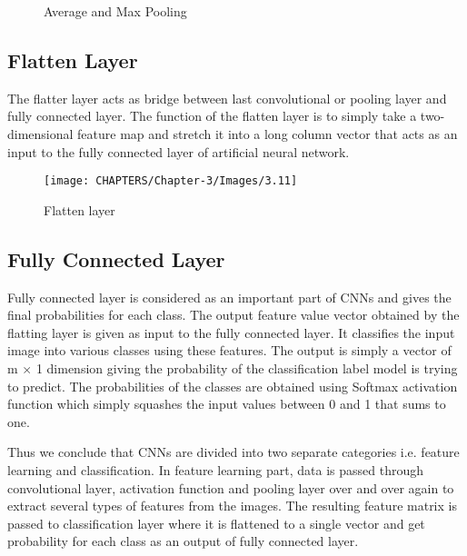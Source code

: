 \begin{figure}%
    \centering
    \qquad
    \caption{Average and Max Pooling}%
    \label{fig:3.10}%
\end{figure}

\subsection{Flatten Layer}

The flatter layer acts as bridge between last convolutional or pooling layer 
and fully connected layer. The function of the flatten layer is to simply take
a two-dimensional feature map and stretch it into a long column vector that acts as 
an input to the fully connected layer of artificial neural network.


\begin{figure}[H]
	\centering
		\texttt{[image: CHAPTERS/Chapter-3/Images/3.11]}
	\caption{Flatten layer}
	\label{fig:3.11}
\end{figure}


\subsection{Fully Connected Layer} 

Fully connected layer is considered as an important 
part of CNNs and gives the final 
probabilities for each class.  The output feature value vector obtained by the flatting layer is 
given as input to the fully connected layer. It classifies the input image into various classes using these features. The output is simply a vector 
of m $\times$ 1 dimension giving the probability of the 
classification label model is trying to predict. The probabilities of the
classes are obtained using Softmax activation function which simply squashes the input values between 0 and 1 that sums to one.

Thus we conclude that CNNs are divided into two separate categories i.e. feature learning and classification. In feature learning part,
 data is passed through convolutional layer, activation function and pooling layer over and over again to extract several types
of features from the images. The resulting feature matrix is passed to classification
layer where it is flattened to a single vector and get probability for each class as an output of fully connected layer.
